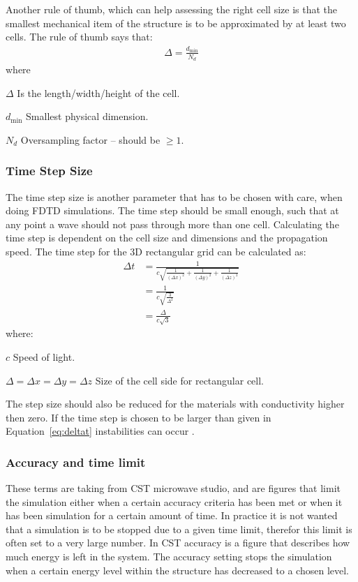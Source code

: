 Another rule of thumb, which can help assessing the right cell size is that the smallest mechanical item of the structure is to be approximated by at least two cells. The rule of thumb says that\cite{kunz1993fdtd}:
\begin{align}
    \Delta = \frac{d_{\text{min}}}{N_d} 
\end{align}
where 
\begin{where}
\item[$\Delta$] Is the length/width/height of the cell.
\item[$d_{\text{min}}$] Smallest physical dimension.
\item[$N_d$] Oversampling factor -- should be $\geq 1$.
\end{where}


\subsubsection{Time Step Size}
The time step size is another parameter that has to be chosen with care, when doing FDTD simulations. The time step should be small enough, such that at any point a wave should not pass through more than one cell.  Calculating the time step is dependent on the cell size and dimensions and the propagation speed.  The time step for the 3D rectangular grid can be calculated as:
\begin{align}
   \Delta t &= \frac{1}{c \sqrt{\frac{1}{(\Delta x)^2}+\frac{1}{(\Delta y)^2}+\frac{1}{(\Delta z)^2}}} \\
            &= \frac{1}{c \sqrt{\frac{3}{\Delta^2}}} \\
            &= \frac{\Delta}{c \sqrt{3}} \label{eq:deltat}           
\end{align}
where:
\begin{where}
\item [$c$] Speed of light.
\item [$\Delta = \Delta x = \Delta y = \Delta z$] Size of the cell side for rectangular cell.
\end{where}
The step size should also be reduced for the materials with conductivity higher then zero. If the time step is chosen to be larger than given in Equation~\ref{eq:deltat} instabilities can occur \cite{kunz1993fdtd}.   

\subsubsection{Accuracy and time limit}
These terms are taking from CST microwave studio, and are figures that limit the simulation either when a certain accuracy criteria has been met or when it has been simulation for a certain amount of time. In practice it is not wanted that a simulation is to be stopped due to a given time limit, therefor this limit is often set to a very large number. In CST accuracy is a figure that describes how much energy is left in the system. The accuracy setting stops the simulation when a certain energy level within the structure has decreased to a chosen level. 
